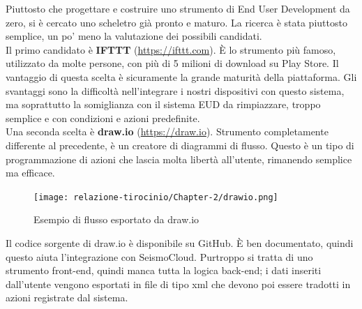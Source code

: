 \documentclass[a4paper,10pt]{memoir}
\begin{document}
Piuttosto che progettare e costruire uno strumento di End User Development da zero, si è cercato uno scheletro già pronto e maturo. La ricerca è stata piuttosto semplice, un po' meno la valutazione dei possibili candidati.
\\
Il primo candidato è \textbf{IFTTT} (\href{https://iftt.com}{https://ifttt.com}). È lo strumento più famoso, utilizzato da molte persone, con più di 5 milioni di download su Play Store. Il vantaggio di questa scelta è sicuramente la grande maturità della piattaforma. Gli svantaggi sono la difficoltà nell'integrare i nostri dispositivi con questo sistema, ma soprattutto la somiglianza con il sistema EUD da rimpiazzare, troppo semplice e con condizioni e azioni predefinite.
\\
Una seconda scelta è \textbf{draw.io} (\href{https://app.diagrams.net/}{https://draw.io}). Strumento completamente differente al precedente, è un creatore di diagrammi di flusso. Questo è un tipo di programmazione di azioni che lascia molta libertà all'utente, rimanendo semplice ma efficace. 
\begin{figure}[H]
\caption{Esempio di flusso esportato da draw.io}
\label{fig:drawio}
\texttt{[image: relazione-tirocinio/Chapter-2/drawio.png]}
\end{figure}
Il codice sorgente di draw.io è disponibile su GitHub. È  ben documentato, quindi questo aiuta l'integrazione con SeismoCloud. Purtroppo si tratta di uno strumento front-end, quindi manca tutta la logica back-end; i dati inseriti dall'utente vengono esportati in file di tipo xml che devono poi essere tradotti in azioni registrate dal sistema. 
\\
\end{document}
